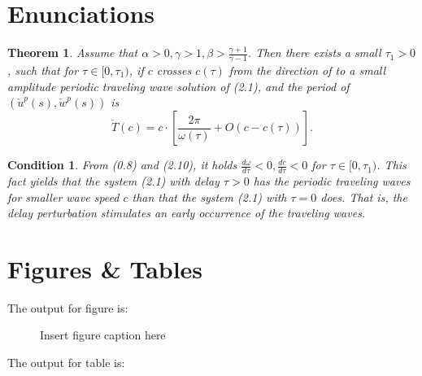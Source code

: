 \documentclass{rsproca}%
\newtheorem{theorem}{\bf Theorem}[section]
\newtheorem{condition}{\bf Condition}[section]
\begin{document}

\maketitle

\section{Enunciations}

\begin{theorem}\label{T0.1}
Assume that $\alpha>0, \gamma>1, \beta>\frac{\gamma+1}{\gamma-1}$.
Then there exists a small $\tau_1>0$, such that for $\tau\in
[0,\tau_1)$, if $c$ crosses $c(\tau)$ from the direction of
to  a small amplitude periodic traveling wave solution of
(2.1), and the period of $(\check{u}^p(s),\check{w}^p(s))$ is
\[
\check{T}(c)=c\cdot \left[\frac{2\pi}{\omega(\tau)}+O(c-c(\tau))\right].
\]
\end{theorem}


\begin{condition}\label{C2.2}
From (0.8) and (2.10), it holds
$\frac{d\omega}{d\tau}<0,\frac{dc}{d\tau}<0$ for $\tau\in
[0,\tau_1)$. This fact yields that the system (2.1) with delay
$\tau>0$ has the periodic traveling waves for smaller wave speed $c$
than that the system (2.1) with $\tau=0$ does. That is, the
delay perturbation stimulates an early occurrence of the traveling waves.
\end{condition}


\section{Figures \& Tables}

The output for figure is:

\begin{figure}[!h]
\caption{Insert figure caption here}
\label{fig_sim}
\end{figure}

\vspace*{-10pt}

\noindent The output for table is:
\end{document}
